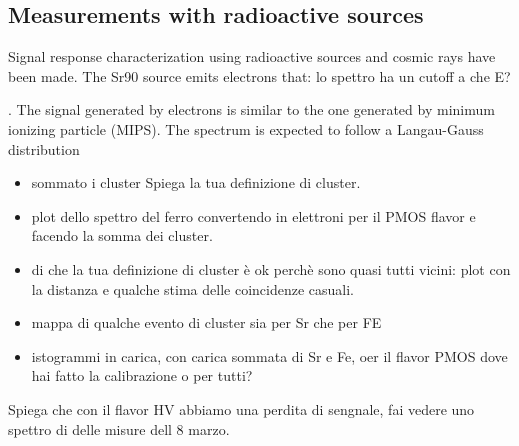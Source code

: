     \subsection{Measurements with radioactive sources}
        Signal response characterization using radioactive sources and cosmic rays have been made. 
        The Sr90 source emits electrons that: lo spettro ha un cutoff a che E?  

        .
        The signal generated by electrons is similar to the one generated by minimum ionizing particle (MIPS).
        The spectrum is expected to follow a Langau-Gauss distribution

        \begin{itemize}
            \item sommato i cluster Spiega la tua definizione di cluster.
            \item plot dello spettro del ferro convertendo in elettroni per il PMOS flavor e facendo la somma dei cluster. 
            \item di che la tua definizione di cluster è ok perchè sono quasi tutti vicini: plot con la distanza e qualche stima delle coincidenze casuali.
            \item mappa di qualche evento di cluster sia per Sr che per FE
            \item istogrammi in carica, con carica sommata di Sr e Fe, oer il flavor PMOS dove hai fatto la calibrazione o per tutti?
        \end{itemize}

        Spiega che con il flavor HV abbiamo una perdita di sengnale, fai vedere uno spettro di delle misure dell 8 marzo. 

       
   
         

